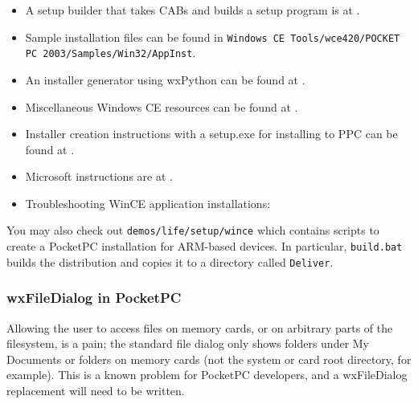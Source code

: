\itemsep=0pt
\begin{itemize}
\item A setup builder that takes CABs and builds a setup program is at .
\item Sample installation files can be found in {\tt Windows CE Tools/wce420/POCKET PC 2003/Samples/Win32/AppInst}.
\item An installer generator using wxPython can be found at .
\item Miscellaneous Windows CE resources can be found at .
\item Installer creation instructions with a setup.exe for installing to PPC can be found at .
\item Microsoft instructions are at .
\item Troubleshooting WinCE application installations: 
\end{itemize}

You may also check out {\tt demos/life/setup/wince} which contains
scripts to create a PocketPC installation for ARM-based
devices. In particular, {\tt build.bat} builds the distribution and
copies it to a directory called {\tt Deliver}.

\subsubsection{wxFileDialog in PocketPC}

Allowing the user to access files on memory cards, or on arbitrary
parts of the filesystem, is a pain; the standard file dialog only
shows folders under My Documents or folders on memory cards
(not the system or card root directory, for example). This is
a known problem for PocketPC developers, and a wxFileDialog
replacement will need to be written.

